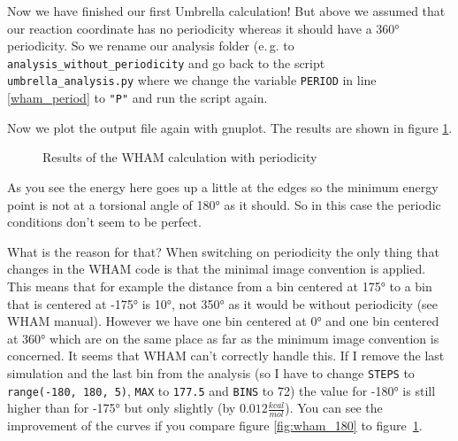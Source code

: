 \documentclass[a4paper,11pt]{scrartcl}
\begin{document}
Now we have finished our first Umbrella calculation! But above we assumed that our reaction coordinate has no periodicity whereas it should have a 360° periodicity. So we rename our analysis folder (e.\,g. to \texttt{analysis\_without\_periodicity} and go back to the script \texttt{umbrella\_analysis.py} where we change the variable \texttt{PERIOD} in line \ref{wham_period} to \texttt{"P"} and run the script again.

Now we plot the output file again with gnuplot. The results are shown in figure \ref{fig:wham_result_period}.

\begin{figure} [htb]
	\caption{Results of the WHAM calculation with periodicity}
	\label{fig:wham_result_period}
\end{figure} 

As you see the energy here goes up a little at the edges so the minimum energy point is not at a torsional angle of 180° as it should. So in this case the periodic conditions don't seem to be perfect.

What is the reason for that? When switching on periodicity the only thing that changes in the WHAM code is that the minimal image convention is applied. This means that for example the distance from a bin centered at 175° to a bin that is centered at -175° is 10°, not 350° as it would be without periodicity (see WHAM manual). However we have one bin centered at 0° and one bin centered at 360° which are on the same place as far as the minimum image convention is concerned. It seems that WHAM can't correctly handle this. If I remove the last simulation and the last bin from the analysis (so I have to change \texttt{STEPS} to \texttt{range(-180, 180, 5)}, \texttt{MAX} to \texttt{177.5} and \texttt{BINS} to 72) the value for -180° is still higher than for -175° but only slightly (by $0.012 \frac{kcal}{mol}$). You can see the improvement of the curves if you compare figure \ref{fig:wham_180} to \mbox{figure \ref{fig:wham_result_period}}.
\end{document}
